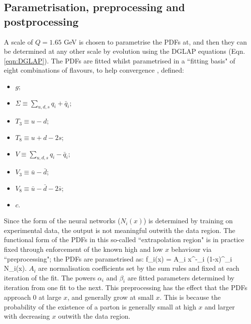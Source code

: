\subsection{Parametrisation, preprocessing and postprocessing}
A scale of $Q=1.65$ GeV is chosen to parametrise the PDFs at, and then they can be determined at any other scale by evolution using the DGLAP equations (Eqn. \ref{eqn:DGLAP}). The PDFs are fitted whilst parametrised in a ``fitting basis" of eight combinations of flavours, to help convergence \cite{Ball:2014uwa}, defined:
\begin{itemize}
\item $g$;
\item $\Sigma \equiv \sum_{u,d,s} q_i + \bar{q}_i$;
\item $T_3 \equiv u - d$;
\item $T_8 \equiv u + d - 2s$;
\item $V \equiv \sum_{u, d, s} q_i - \bar{q}_i$;
\item $V_3 \equiv \bar{u} - \bar{d}$;
\item $V_8 \equiv \bar{u} - \bar{d} - 2 \bar{s}$;
\item $c$.
\end{itemize}
Since the form of the neural networks ($N_i(x)$) is determined by training on experimental data, the output is not meaningful outwith the data region. The functional form of the PDFs in this so-called ``extrapolation region" is in practice fixed through enforcement of the known high and low $x$ behaviour via ``preprocessing"; the PDFs are parametrised as:
\beq
  f_i(x) = A_i x^{-\alpha_i} (1-x)^{\beta_i} N_i(x).
\eeq
$A_i$ are normalisation coefficients set by the sum rules and fixed at each iteration of the fit. The powers $\alpha_i$ and $\beta_i$ are fitted parameters determined by iteration from one fit to the next. This preprocessing has the effect that the PDFs approach 0 at large $x$, and generally grow at small $x$. This is because the probability of the existence of a parton is generally small at high $x$ and larger with decreasing $x$ outwith the data region.

